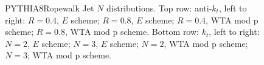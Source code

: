 \begin{figure}[H]
\hfill
{}\hfill
\caption{PYTHIA8Ropewalk Jet $N$ distributions. Top row: anti-$k_t$, left to right: $R=0.4$, $E$ scheme; $R=0.8$, $E$ scheme; $R=0.4$, WTA mod p scheme; $R=0.8$, WTA mod p scheme. Bottom row: $k_t$, left to right: $N=2$, $E$ scheme; $N=3$, $E$ scheme; $N=2$, WTA mod p scheme; $N=3$; WTA mod p scheme.}  
\end{figure} 

